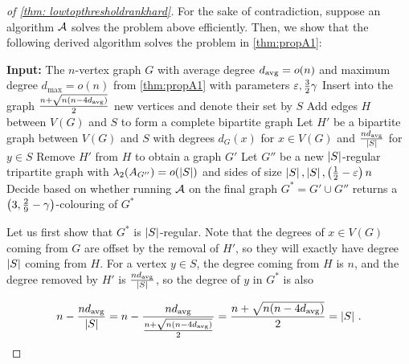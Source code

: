 \begin{proof}[of \cref{thm: lowtopthresholdrankhard}]
    For the sake of contradiction, suppose an algorithm $\mathcal{A}$ solves the problem above efficiently.
    Then, we show that the following derived algorithm solves the problem in \cref{thm:propA1}:

    \begin{algorithm}[H]
        \caption{Low top-threshold rank hardness algorithm}
        \label{alg: lowtopthresholdrankhard}
        \DontPrintSemicolon
        \textbf{Input:} The $n$-vertex graph $G$ with average degree $d_{\operatorname{avg}} = o(n)$ and maximum degree $d_{\max} = o(n)$ from \cref{thm:propA1} with parameters $\varepsilon, \frac{3}{2}\gamma$\;
        Insert into the graph $\frac{n+\sqrt{n(n-4d_{\operatorname{avg}})}}{2}$ new vertices and denote their set by $S$\;
        Add edges $H$ between $V(G)$ and $S$ to form a complete bipartite graph\;
        Let $H'$ be a bipartite graph between $V(G)$ and $S$ with degrees $d_G(x)$ for $x\in V(G)$ and $\frac{nd_{\operatorname{avg}}}{\left\lvert S\right\rvert}$ for $y\in S$\;
        Remove $H'$ from $H$ to obtain a graph $G'$\;
        Let $G''$ be a new $\left\lvert S\right\rvert$-regular tripartite graph with $\lambda_2(A_{G''})=o(\left\lvert S\right\rvert)$ and sides of size $\left\lvert S\right\rvert, \left\lvert S\right\rvert, \left(\frac{1}{2} - \varepsilon\right)n\;$\footnotemark{}\;
        Decide based on whether running $\mathcal{A}$ on the final graph $G^* = G' \cup G''$ returns a $\left(3, \frac{2}{9}-\gamma\right)$-colouring of $G^*$\;
    \end{algorithm}

    Let us first show that $G^*$ is $\left\lvert S\right\rvert$-regular. Note that the degrees of $x\in V(G)$ coming from $G$ are offset by the removal of $H'$, so they will exactly have degree $\left\lvert S\right\rvert$ coming from $H$. For a vertex $y\in S$, the degree coming from $H$ is $n$, and the degree removed by $H'$ is $\frac{nd_{\operatorname{avg}}}{\left\lvert S\right\rvert}$, so the degree of $y$ in $G^*$ is also
        
    $$n-\frac{nd_{\operatorname{avg}}}{\left\lvert S\right\rvert}=n-\frac{nd_{\operatorname{avg}}}{\frac{n+\sqrt{n(n-4d_{\operatorname{avg}})}}{2}}=\frac{n+\sqrt{n(n-4d_{\operatorname{avg}})}}{2}=\left\lvert S\right\rvert\,.$$



\end{proof}
